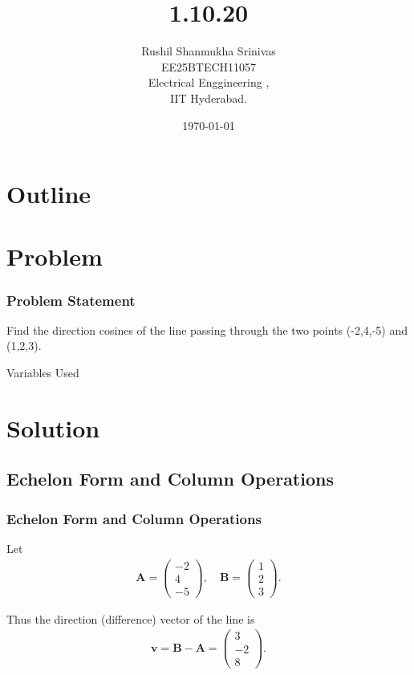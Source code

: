 \documentclass{beamer}
\title{1.10.20}
\author{Rushil Shanmukha Srinivas \\EE25BTECH11057 \\ Electrical Enggineering ,\\IIT Hyderabad.}
\date{\today}
\theoremstyle{remark}
\newcommand{\myvec}[1]{\ensuremath{\begin{pmatrix}#1\end{pmatrix}}}
\let\vec\mathbf
\numberwithin{equation}{section}
\begin{document}
 

\begin{frame}
\titlepage
\end{frame}

\section*{Outline}
\begin{frame}
\tableofcontents
\end{frame}
\section{Problem}
\begin{frame}
\frametitle{Problem Statement}

Find the direction cosines of the line passing through the two points (-2,4,-5) and (1,2,3).
\\ \begin{table}[h!]    
  \centering
  
  \caption{Variables Used}
\end{table}
\end{frame}
\section{Solution}
\subsection{Echelon Form and Column Operations}
\begin{frame}
\frametitle{Echelon Form and Column Operations}
Let
\begin{align}
\vec{A}=\myvec {-2 \\ 4 \\ -5} ,\quad
\vec{B}=\myvec {1 \\ 2 \\ 3} .
\end{align}

Thus the direction (difference) vector of the line is
\begin{align}
\vec{v}=\vec{B}-\vec{A}=\myvec {3 \\ -2 \\ 8} .
\end{align}

\end{frame}
\end{document}
